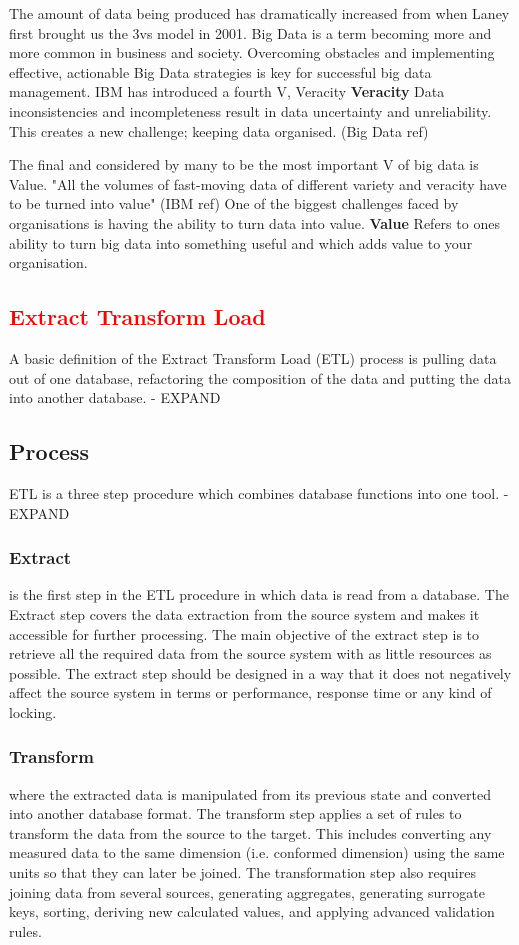 The amount of data being produced has dramatically increased from when Laney first brought us the 3vs model in 2001. Big Data is a term becoming more and more common in business and society. Overcoming obstacles and implementing effective, actionable Big Data strategies is key for successful big data management. IBM has introduced a fourth V, Veracity \textbf{Veracity} Data inconsistencies and incompleteness result in data uncertainty and unreliability. This creates a new challenge; keeping data organised. (Big Data ref)

The final and considered by many to be the most important V of big data is Value. "All the volumes of fast-moving data of different variety and veracity have to be turned into value" (IBM ref) One of the biggest challenges faced by organisations is having the ability to turn data into value. \textbf{Value} Refers to ones ability to turn big data into something useful and which adds value to your organisation.

\textcolor{red}{\section{Extract Transform Load}}\label{etl}
A basic definition of the Extract Transform Load (ETL) process is pulling data out of one database, refactoring the composition of the data and putting the data into another database. - EXPAND

\subsection{Process}
ETL is a three step procedure which combines database functions into one tool. - EXPAND

\subsubsection{Extract} is the first step in the ETL procedure in which data is read from a database. The Extract step covers the data extraction from the source system and makes it accessible for further processing. The main objective of the extract step is to retrieve all the required data from the source system with as little resources as possible. The extract step should be designed in a way that it does not negatively affect the source system in terms or performance, response time or any kind of locking.

\subsubsection{Transform} where the extracted data is manipulated from its previous state and converted into another database format. The transform step applies a set of rules to transform the data from the source to the target. This includes converting any measured data to the same dimension (i.e. conformed dimension) using the same units so that they can later be joined. The transformation step also requires joining data from several sources, generating aggregates, generating surrogate keys, sorting, deriving new calculated values, and applying advanced validation rules.

